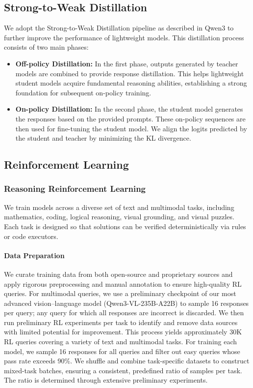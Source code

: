 \documentclass{article} %
\begin{document}
\subsection{Strong-to-Weak Distillation}

We adopt the Strong-to-Weak Distillation pipeline as described in Qwen3 to further improve the performance of lightweight models. This distillation process consists of two main phases:
\begin{itemize}[itemindent=0pt, labelsep=4pt, leftmargin=*]

\item \textbf{Off-policy Distillation:} In the first phase, outputs generated by teacher models are combined to provide response distillation. This helps lightweight student models acquire fundamental reasoning abilities, establishing a strong foundation for subsequent on-policy training.

\item \textbf{On-policy Distillation:} In the second phase, the student model generates the responses based on the provided prompts. These on-policy sequences are then used for fine-tuning the student model. We align the logits predicted by the student and teacher by minimizing the KL divergence.

\end{itemize}

\subsection{Reinforcement Learning}
\subsubsection{Reasoning Reinforcement Learning}

We train models across a diverse set of text and multimodal tasks, including mathematics, coding, logical reasoning, visual grounding, and visual puzzles. Each task is designed so that solutions can be verified deterministically via rules or code executors. 

\paragraph{Data Preparation}
We curate training data from both open-source and proprietary sources and apply rigorous preprocessing and manual annotation to ensure high-quality RL queries. For multimodal queries, we use a preliminary checkpoint of our most advanced vision–language model (Qwen3-VL-235B-A22B) to sample 16 responses per query; any query for which all responses are incorrect is discarded. We then run preliminary RL experiments per task to identify and remove data sources with limited potential for improvement. This process yields approximately 30K RL queries covering a variety of text and multimodal tasks.
For training each model, we sample 16 responses for all queries and filter out easy queries whose pass rate exceeds 90\%. We shuffle and combine task-specific datasets to construct mixed-task batches, ensuring a consistent, predefined ratio of samples per task. The ratio is determined through extensive preliminary experiments.
\end{document}
